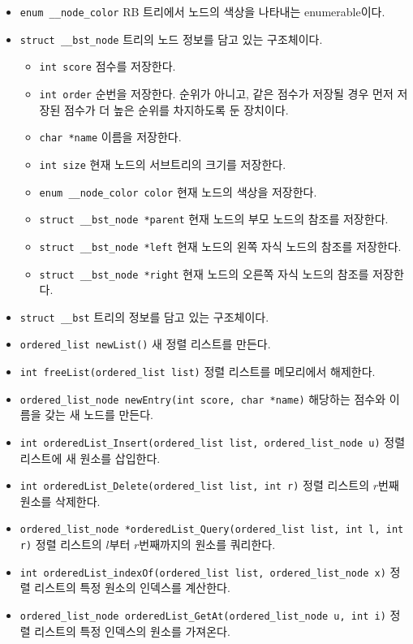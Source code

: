 \begin{itemize}
    \item \texttt{enum __node_color}
    RB 트리에서 노드의 색상을 나타내는 enumerable이다.
    \item \texttt{struct __bst_node}
    트리의 노드 정보를 담고 있는 구조체이다.
    \begin{itemize}
        \item \texttt{int score} 점수를 저장한다.
        \item \texttt{int order} 순번을 저장한다. 순위가 아니고, 같은 점수가 저장될 경우 먼저 저장된 점수가 더 높은 순위를 차지하도록 둔 장치이다.
        \item \texttt{char *name} 이름을 저장한다.
        \item \texttt{int size} 현재 노드의 서브트리의 크기를 저장한다.
        \item \texttt{enum __node_color color} 현재 노드의 색상을 저장한다.
        \item \texttt{struct __bst_node *parent} 현재 노드의 부모 노드의 참조를 저장한다.
        \item \texttt{struct __bst_node *left} 현재 노드의 왼쪽 자식 노드의 참조를 저장한다.
        \item \texttt{struct __bst_node *right} 현재 노드의 오른쪽 자식 노드의 참조를 저장한다.
    \end{itemize}
    \item \texttt{struct __bst}
    트리의 정보를 담고 있는 구조체이다.
    \item \texttt{ordered_list newList()}
    새 정렬 리스트를 만든다.
    \item \texttt{int freeList(ordered_list list)}
    정렬 리스트를 메모리에서 해제한다.
    \item \texttt{ordered_list_node newEntry(int score, char *name)}
    해당하는 점수와 이름을 갖는 새 노드를 만든다.
    \item \texttt{int orderedList_Insert(ordered_list list, ordered_list_node u)}
    정렬 리스트에 새 원소를 삽입한다.
    \item \texttt{int orderedList_Delete(ordered_list list, int r)}
    정렬 리스트의 $r$번째 원소를 삭제한다.
    \item \texttt{ordered_list_node *orderedList_Query(ordered_list list, int l, int r)}
    정렬 리스트의 $l$부터 $r$번째까지의 원소를 쿼리한다.
    \item \texttt{int orderedList_indexOf(ordered_list list, ordered_list_node x)}
    정렬 리스트의 특정 원소의 인덱스를 계산한다.
    \item \texttt{ordered_list_node orderedList_GetAt(ordered_list_node u, int i)}
    정렬 리스트의 특정 인덱스의 원소를 가져온다.
\end{itemize}

